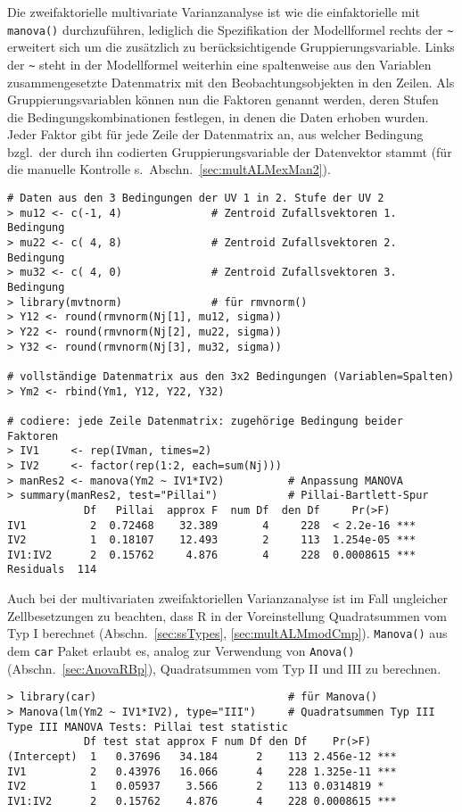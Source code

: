 Die zweifaktorielle multivariate Varianzanalyse ist wie die einfaktorielle mit \lstinline!manova()! durchzuführen, lediglich die Spezifikation der Modellformel rechts der \lstinline!~! erweitert sich um die zusätzlich zu berücksichtigende Gruppierungsvariable. Links der \lstinline!~! steht in der Modellformel weiterhin eine spaltenweise aus den Variablen zusammengesetzte Datenmatrix mit den Beobachtungsobjekten in den Zeilen. Als Gruppierungsvariablen können nun die Faktoren genannt werden, deren Stufen die Bedingungskombinationen festlegen, in denen die Daten erhoben wurden. Jeder Faktor gibt für jede Zeile der Datenmatrix an, aus welcher Bedingung bzgl.\ der durch ihn codierten Gruppierungsvariable der Datenvektor stammt (für die manuelle Kontrolle s.\ Abschn.\ \ref{sec:multALMexMan2}).
\begin{lstlisting}
# Daten aus den 3 Bedingungen der UV 1 in 2. Stufe der UV 2
> mu12 <- c(-1, 4)              # Zentroid Zufallsvektoren 1. Bedingung
> mu22 <- c( 4, 8)              # Zentroid Zufallsvektoren 2. Bedingung
> mu32 <- c( 4, 0)              # Zentroid Zufallsvektoren 3. Bedingung
> library(mvtnorm)              # für rmvnorm()
> Y12 <- round(rmvnorm(Nj[1], mu12, sigma))
> Y22 <- round(rmvnorm(Nj[2], mu22, sigma))
> Y32 <- round(rmvnorm(Nj[3], mu32, sigma))

# vollständige Datenmatrix aus den 3x2 Bedingungen (Variablen=Spalten)
> Ym2 <- rbind(Ym1, Y12, Y22, Y32)

# codiere: jede Zeile Datenmatrix: zugehörige Bedingung beider Faktoren
> IV1     <- rep(IVman, times=2)
> IV2     <- factor(rep(1:2, each=sum(Nj)))
> manRes2 <- manova(Ym2 ~ IV1*IV2)          # Anpassung MANOVA
> summary(manRes2, test="Pillai")           # Pillai-Bartlett-Spur
            Df   Pillai  approx F  num Df  den Df     Pr(>F)
IV1          2  0.72468    32.389       4     228  < 2.2e-16 ***
IV2          1  0.18107    12.493       2     113  1.254e-05 ***
IV1:IV2      2  0.15762     4.876       4     228  0.0008615 ***
Residuals  114
\end{lstlisting}

Auch bei der multivariaten zweifaktoriellen Varianzanalyse ist im Fall ungleicher Zellbesetzungen zu beachten, dass R in der Voreinstellung Quadratsummen vom Typ I berechnet (Abschn.\ \ref{sec:ssTypes}, \ref{sec:multALMmodCmp}). \lstinline!Manova()! aus dem  \lstinline!car! Paket erlaubt es, analog zur Verwendung von \lstinline!Anova()! (Abschn.\ \ref{sec:AnovaRBp}), Quadratsummen vom Typ II und III zu berechnen.
\begin{lstlisting}
> library(car)                              # für Manova()
> Manova(lm(Ym2 ~ IV1*IV2), type="III")     # Quadratsummen Typ III
Type III MANOVA Tests: Pillai test statistic
            Df test stat approx F num Df den Df    Pr(>F)    
(Intercept)  1   0.37696   34.184      2    113 2.456e-12 ***
IV1          2   0.43976   16.066      4    228 1.325e-11 ***
IV2          1   0.05937    3.566      2    113 0.0314819 *  
IV1:IV2      2   0.15762    4.876      4    228 0.0008615 ***
\end{lstlisting}


